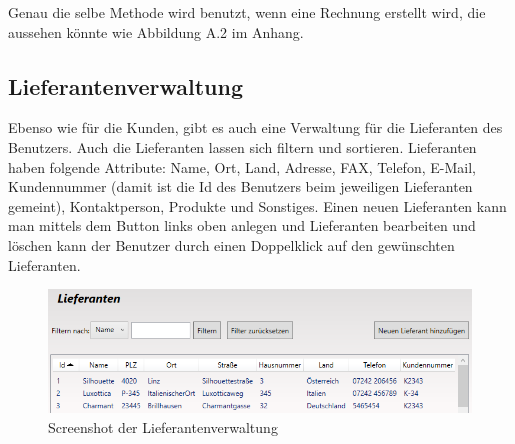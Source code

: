 Genau die selbe Methode wird benutzt, wenn eine Rechnung erstellt wird, die aussehen könnte wie Abbildung A.2 im Anhang.\newline
\subsection{Lieferantenverwaltung}
Ebenso wie für die Kunden, gibt es auch eine Verwaltung für die Lieferanten des Benutzers. Auch die Lieferanten lassen sich filtern und sortieren. Lieferanten haben folgende Attribute: Name, Ort, Land, Adresse, FAX, Telefon, E-Mail, Kundennummer (damit ist die Id des Benutzers beim jeweiligen Lieferanten gemeint), Kontaktperson, Produkte und Sonstiges. \newline Einen neuen Lieferanten kann man mittels dem Button links oben anlegen und Lieferanten bearbeiten und löschen kann der Benutzer durch einen Doppelklick auf den gewünschten Lieferanten.
\begin{figure}[H]
\begin{center}
	\includegraphics[scale=.75]{images/Lieferanten.png}
\end{center}
	\caption{Screenshot der Lieferantenverwaltung}
	\label{fig:sample}
\end{figure}
